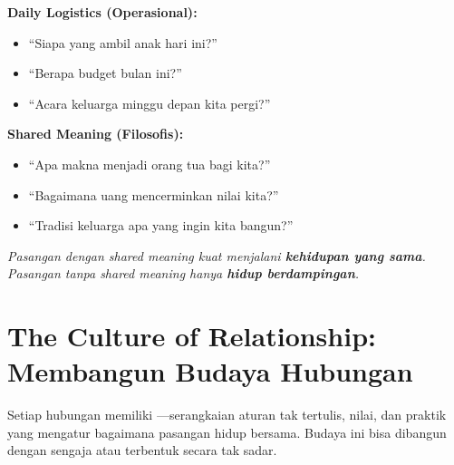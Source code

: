 \begin{warningbox}
\textbf{Daily Logistics (Operasional):}
\begin{itemize}
    \item ``Siapa yang ambil anak hari ini?''
    \item ``Berapa budget bulan ini?''
    \item ``Acara keluarga minggu depan kita pergi?''
\end{itemize}

\textbf{Shared Meaning (Filosofis):}
\begin{itemize}
    \item ``Apa makna menjadi orang tua bagi kita?''
    \item ``Bagaimana uang mencerminkan nilai kita?''
    \item ``Tradisi keluarga apa yang ingin kita bangun?''
\end{itemize}

\textit{Pasangan dengan shared meaning kuat menjalani \textbf{kehidupan yang sama}. Pasangan tanpa shared meaning hanya \textbf{hidup berdampingan}.}
\end{warningbox}

\section{The Culture of Relationship: Membangun Budaya Hubungan}

Setiap hubungan memiliki ---serangkaian aturan tak tertulis, nilai, dan praktik yang mengatur bagaimana pasangan hidup bersama. Budaya ini bisa dibangun dengan sengaja atau terbentuk secara tak sadar.

